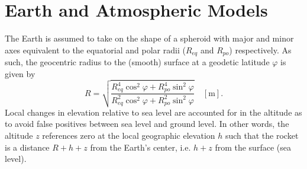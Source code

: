 \documentclass[11pt]{thesis}
\numberwithin{equation}{section}
\begin{document}
\section{Earth and Atmospheric Models}
The Earth is assumed to take on the shape of a spheroid with major and minor axes equivalent to the equatorial and polar radii ($R_{eq}$ and $R_{po}$) respectively. As such, the geocentric radius to the (smooth) surface at a geodetic latitude $\varphi$ is given by
\begin{equation}
R = \sqrt{\frac{R_{eq}^4 \cos^2 \varphi + R_{po}^4 \sin^2 \varphi}{R_{eq}^2 \cos^2 \varphi + R_{po}^2 \sin^2 \varphi}} \quad [\si{\m}].
\end{equation}
Local changes in elevation relative to sea level are accounted for in the altitude as to avoid false positives between sea level and ground level. In other words, the altitude $z$ references zero at the local geographic elevation $h$ such that the rocket is a distance $R + h + z$ from the Earth's center, i.e. $h + z$ from the surface (sea level).
\end{document}
